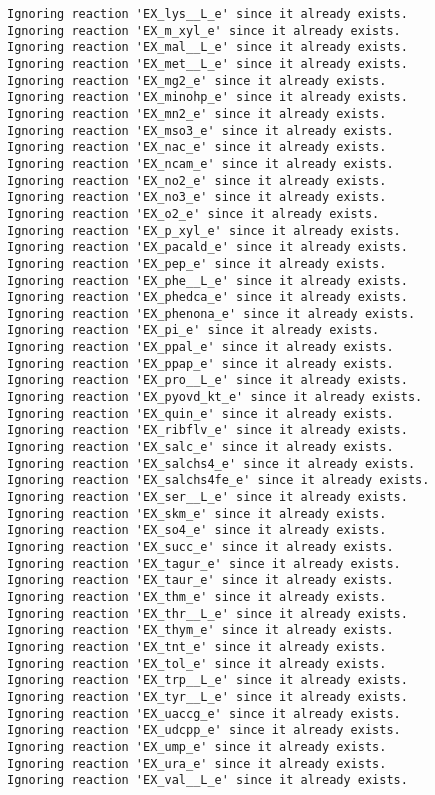 \documentclass[
  letterpaper,
  DIV=11,
  numbers=noendperiod]{scrartcl}
\begin{document}
\begin{verbatim}
Ignoring reaction 'EX_lys__L_e' since it already exists.
Ignoring reaction 'EX_m_xyl_e' since it already exists.
Ignoring reaction 'EX_mal__L_e' since it already exists.
Ignoring reaction 'EX_met__L_e' since it already exists.
Ignoring reaction 'EX_mg2_e' since it already exists.
Ignoring reaction 'EX_minohp_e' since it already exists.
Ignoring reaction 'EX_mn2_e' since it already exists.
Ignoring reaction 'EX_mso3_e' since it already exists.
Ignoring reaction 'EX_nac_e' since it already exists.
Ignoring reaction 'EX_ncam_e' since it already exists.
Ignoring reaction 'EX_no2_e' since it already exists.
Ignoring reaction 'EX_no3_e' since it already exists.
Ignoring reaction 'EX_o2_e' since it already exists.
Ignoring reaction 'EX_p_xyl_e' since it already exists.
Ignoring reaction 'EX_pacald_e' since it already exists.
Ignoring reaction 'EX_pep_e' since it already exists.
Ignoring reaction 'EX_phe__L_e' since it already exists.
Ignoring reaction 'EX_phedca_e' since it already exists.
Ignoring reaction 'EX_phenona_e' since it already exists.
Ignoring reaction 'EX_pi_e' since it already exists.
Ignoring reaction 'EX_ppal_e' since it already exists.
Ignoring reaction 'EX_ppap_e' since it already exists.
Ignoring reaction 'EX_pro__L_e' since it already exists.
Ignoring reaction 'EX_pyovd_kt_e' since it already exists.
Ignoring reaction 'EX_quin_e' since it already exists.
Ignoring reaction 'EX_ribflv_e' since it already exists.
Ignoring reaction 'EX_salc_e' since it already exists.
Ignoring reaction 'EX_salchs4_e' since it already exists.
Ignoring reaction 'EX_salchs4fe_e' since it already exists.
Ignoring reaction 'EX_ser__L_e' since it already exists.
Ignoring reaction 'EX_skm_e' since it already exists.
Ignoring reaction 'EX_so4_e' since it already exists.
Ignoring reaction 'EX_succ_e' since it already exists.
Ignoring reaction 'EX_tagur_e' since it already exists.
Ignoring reaction 'EX_taur_e' since it already exists.
Ignoring reaction 'EX_thm_e' since it already exists.
Ignoring reaction 'EX_thr__L_e' since it already exists.
Ignoring reaction 'EX_thym_e' since it already exists.
Ignoring reaction 'EX_tnt_e' since it already exists.
Ignoring reaction 'EX_tol_e' since it already exists.
Ignoring reaction 'EX_trp__L_e' since it already exists.
Ignoring reaction 'EX_tyr__L_e' since it already exists.
Ignoring reaction 'EX_uaccg_e' since it already exists.
Ignoring reaction 'EX_udcpp_e' since it already exists.
Ignoring reaction 'EX_ump_e' since it already exists.
Ignoring reaction 'EX_ura_e' since it already exists.
Ignoring reaction 'EX_val__L_e' since it already exists.

\end{verbatim}
\end{document}
